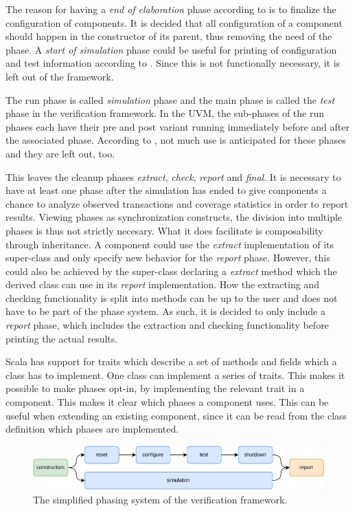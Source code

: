 \documentclass[11pt,a4paper]{report}
\begin{document}
The reason for having a \textit{end of elaboration} phase according to \cite[Ch 4.6]{mehta2018asic} is to finalize
the configuration of components. It is decided that all configuration of a component should happen in the constructor
of its parent, thus removing the need of the phase. A \textit{start of simulation} phase could be useful for printing
of configuration and test information according to \cite[4.6]{mehta2018asic}. Since this is not functionally
necessary, it is left out of the framework.

The run phase is called \textit{simulation} phase and the main phase is called the \textit{test} phase in the
verification framework. In the UVM, the sub-phases of the run phases each have their pre and post variant running
immediately before and
after the associated phase. According to \cite[Ch 4.6]{mehta2018asic}, not much use is anticipated for these phases
and they are left out, too.

This leaves the cleanup phases \textit{extract}, \textit{check}, \textit{report} and \textit{final}. It is necessary
to have at least one phase after the simulation has ended to give components a chance to analyze observed
transactions and coverage statistics in order to report results. Viewing phases as synchronization constructs, the
division into multiple phases is thus not strictly necesary. What it does facilitate is composability through
inheritance. A component could use the \textit{extract} implementation of its super-class and only specify new
behavior for the \textit{report} phase. However, this could also be achieved by the super-class declaring a
\textit{extract} method which the derived class can use in its \textit{report} implementation. How the extracting and
checking functionality is split into methods can be up to the user and does not have to be part of the phase system.
As such, it is decided to only include a \textit{report} phase, which includes the extraction and checking
functionality before printing the actual results.

Scala has support for traits which describe a set of methods and fields which a class has to implement. One class can
implement a series of traits. This makes it possible to make phases opt-in, by implementing the relevant trait in a
component. This makes it clear which phases a component uses. This can be useful when extending an existing
component, since it can be read from the class definition which phases are implemented.

\begin{figure}
  \centering
  \includegraphics[width=\textwidth]{diagrams/own_phases.pdf}
  \caption{The simplified phasing system of the verification framework.}
  \label{fig:phases}
\end{figure}
\end{document}
